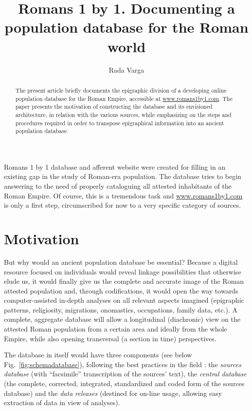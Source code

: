 \documentclass[amsthm,ebook]{saparticle}
\title{Romans 1 by 1. Documenting a population database for the Roman world}
\author[CLUJ]{Rada Varga\corref{first}}
\begin{document}
\maketitle

\begin{abstract}
 The present article briefly documents the epigraphic division of a developing online population database for the Roman
Empire, accessible at \url{www.romans1by1.com}. The paper presents the motivation of constructing the database and its
envisioned architecture, in relation with the various sources, while emphasizing on the steps and procedures required
in order to transpose epigraphical information into an ancient population database. 
\end{abstract}



\noindent Romans 1 by 1 database and afferent website were created for filling in an existing gap in the study of Roman-era
population. The database tries to begin answering to the need of properly cataloguing all attested inhabitants of the
Roman Empire. Of course, this is a tremendous task and \url{www.romans1by1.com} is only a first step, circumscribed for now
to a very specific category of sources.


\section{Motivation}


\noindent But why would an ancient population database be essential? Because a digital resource focused on individuals would
reveal linkage possibilities that otherwise elude us, it would finally give us the complete and accurate image of the
Roman attested population and, through codifications, it would open the way towards computer-assisted in-depth analyses
on all relevant aspects imagined (epigraphic patterns, religiosity, migrations, onomastics, occupations, family data,
etc.). A complete, aggregate database will allow a longitudinal (diachronic) view on the attested Roman population from
a certain area and ideally from the whole Empire, while also opening transversal (a section in time) perspectives.

The database in itself would have three components (see below Fig.~\ref{fig:schemadatabase}), following the best practices in the field
\citep{doi:10.3200/HMTS.37.1.34-38}: the \emph{sources database} (with ``facsimile'' transcription of the sources’ text), the \emph{central database} (the complete, corrected, integrated, standardized and coded form of the sources database) and the \emph{data releases} (destined for on-line usage, allowing easy extraction of data in view of analyses). 
\end{document}
